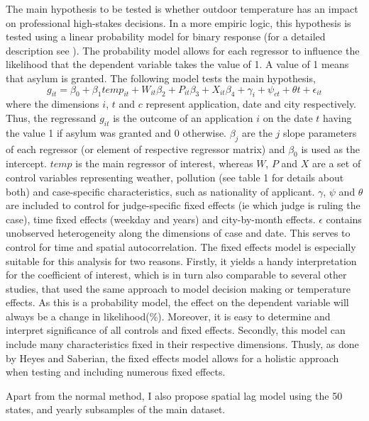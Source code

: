 \documentclass[11pt]{article}
\begin{document}
	The main hypothesis to be tested is whether outdoor temperature has an impact on professional high-stakes decisions. In a more empiric logic, this hypothesis is tested using a linear probability model for binary response (for a detailed description see \cite{wooldridge2010econometric}). The probability model allows for each regressor to influence the likelihood that the dependent variable takes the value of 1. A value of 1 means that asylum is granted. The following model tests the main hypothesis, 
	\newline
	\begin{equation}
		g_{ it } = \beta_{0} + \beta_{1 }temp_{it} + W_{it}\beta_{2} + P_{it}\beta_{3} + X_{it}\beta_{4} + \gamma_{i} + \psi_{ct} + \theta{t} + \epsilon_{it}
	\end{equation}
	where the dimensions \(i\), \(t\) and \(c\) represent application, date and city respectively. Thus, the regressand \(g_{ it }\) is the outcome of an application \(i\) on the date \(t\) having the value 1 if asylum was granted and 0 otherwise. \(\beta_{j}\) are the \(j\) slope parameters of each regressor (or element of respective regressor matrix) and \(\beta_{0}\) is used as the intercept. \(temp\) is the main regressor of interest, whereas \(W\), \(P\) and \(X\) are a set of control variables representing weather, pollution (see table 1 for details about both) and case-specific characteristics, such as nationality of applicant. \(\gamma\), \(\psi\) and \(\theta\) are included to control for judge-specific fixed effects (ie which judge is ruling the case), time fixed effects (weekday and years) and city-by-month effects. \(\epsilon\) contains unobserved heterogeneity along the dimensions of case and date. This serves to control for time and spatial autocorrelation. 
	The fixed effects model is especially suitable for this analysis for two reasons. Firstly, it yields a handy interpretation for the coefficient of interest, which is in turn also comparable to several other studies, that used the same approach to model decision making or temperature effects. As this is a probability model, the effect on the dependent variable will always be a change in likelihood(\%). Moreover, it is easy to determine and interpret significance of all controls and fixed effects. Secondly, this model can include many characteristics fixed in their respective dimensions. Thusly, as done by Heyes and Saberian, the fixed effects model allows for a holistic approach when testing and including numerous fixed effects.
	
	Apart from the normal method, I also propose spatial lag model using the 50 states, and yearly subsamples of the main dataset.
	
\end{document}
